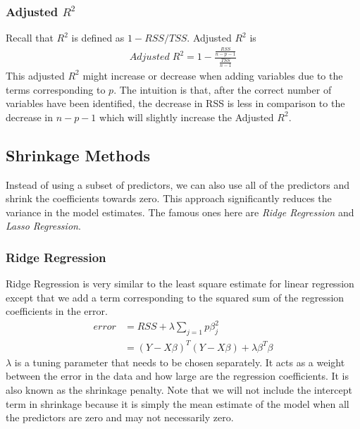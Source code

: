 \documentclass[11pt, a4paper]{article}
\begin{document}
    
    \subsubsection{Adjusted $R^{2}$}
    Recall that $R^{2}$ is defined as $1 - RSS/TSS$. Adjusted $R^{2}$ is
    \begin{align*}
        Adjusted\;R^{2} = 1 - \frac{\frac{RSS}{n-p-1}}{\frac{TSS}{n-1}}
    \end{align*}
    This adjusted $R^{2}$ might increase or decrease when adding variables due to the terms corresponding to $p$. The intuition is that, after the correct number of variables have been identified, the decrease in RSS is less in comparison to the decrease in $n-p-1$ which will slightly increase the Adjusted $R^{2}$.


    \subsection{Shrinkage Methods}
    Instead of using a subset of predictors, we can also use all of the predictors and shrink the coefficients towards zero. This approach significantly reduces the variance in the model estimates. The famous ones here are \emph{Ridge Regression} and \emph{Lasso Regression}.

    
    \subsubsection{Ridge Regression}
    Ridge Regression is very similar to the least square estimate for linear regression except that we add a term corresponding to the squared sum of the regression coefficients in the error.
    \begin{align*}
        error &= RSS + \lambda \sum_{j=1}{p}\beta_{j}^{2}\\
              &= (Y-X\beta)^{T}(Y-X\beta) + \lambda \beta^{T}\beta
    \end{align*}
    $\lambda$ is a tuning parameter that needs to be chosen separately. It acts as a weight between the error in the data and how large are the regression coefficients. It is also known as the shrinkage penalty.\newline
    Note that we will not include the intercept term in shrinkage because it is simply the mean estimate of the model when all the predictors are zero and may not necessarily zero.\newline
\end{document}
